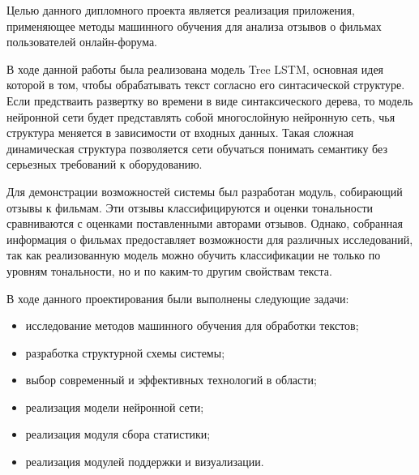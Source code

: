 Целью данного дипломного проекта является реализация приложения, применяющее методы машинного обучения для анализа отзывов о фильмах пользователей онлайн-форума.

В ходе данной работы была реализована модель Tree LSTM, основная идея которой в том, чтобы обрабатывать текст согласно его синтасической структуре. Если предстваить развертку во времени в виде синтаксического дерева, то модель нейронной сети будет представлять собой многослойную нейронную сеть, чья структура меняется в зависимости от входных данных. Такая сложная динамическая структура позволяется сети обучаться понимать семантику без серьезных требований к оборудованию.

Для демонстрации возможностей системы был разработан модуль, собирающий отзывы к фильмам. Эти отзывы классифицируются и оценки тональности сравниваются с оценками поставленными авторами отзывов. Однако, собранная информация о фильмах предоставляет возможности для различных исследований, так как реализованную модель можно обучить классификации не только по уровням тональности, но и по каким-то другим свойствам текста.

В ходе данного проектирования были выполнены следующие задачи:
\begin{itemize}
\item исследование методов машинного обучения для обработки текстов;
\item разработка структурной схемы системы;
\item выбор современный и эффективных технологий в области;
\item реализация модели нейронной сети;
\item реализация модуля сбора статистики;
\item реализация модулей поддержки и визуализации.
\end{itemize}